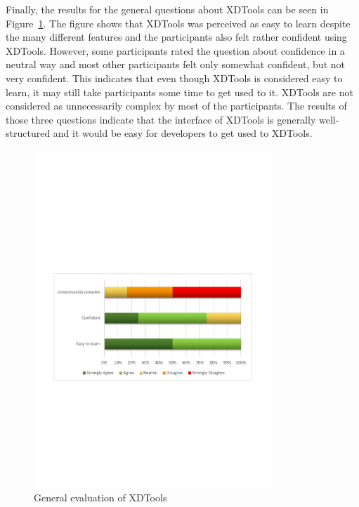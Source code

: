 Finally, the results for the general questions about XDTools can be seen in Figure~\ref{fig:tool_general}. The figure shows that XDTools was perceived as easy to learn despite the many different features and the participants also felt rather confident using XDTools. However, some participants rated the question about confidence in a neutral way and most other participants felt only somewhat confident, but not very confident. This indicates that even though XDTools is considered easy to learn, it may still take participants some time to get used to it. XDTools are not considered as unnecessarily complex by most of the participants. The results of those three questions indicate that the interface of XDTools is generally well-structured and it would be easy for developers to get used to XDTools.

\begin{figure}[H]
  \centering
    \includegraphics[width=0.8\textwidth]{images/charts/tool_general.pdf}
	\caption[General Evaluation]{General evaluation of XDTools}
	\label{fig:tool_general}
\end{figure}

